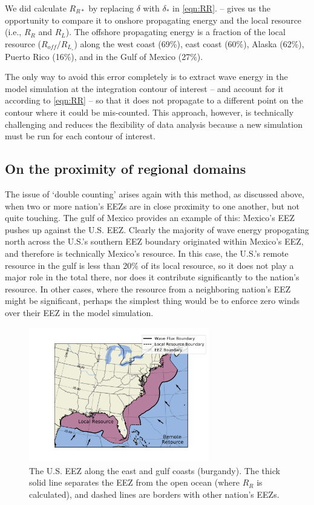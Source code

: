 We did calculate $R_{R*}$ by replacing $\delta$ with $\delta_*$ in \eqref{eqn:RR}. -- gives us the opportunity to compare it to onshore propagating energy and the local resource (i.e., $R_R$ and $R_L$). The offshore propagating energy is a fraction of the local resource ($R_{off} / R_L_\circ$) along the west coast (69\%), east coast (60\%), Alaska (62\%), Puerto Rico (16\%), and in the Gulf of Mexico (27\%). 


The only way to avoid this error completely is to extract wave energy in the model simulation at the integration contour of interest -- and account for it according to \eqref{eqn:RR} -- so that it does not propagate to a different point on the contour where it could be mis-counted. This approach, however, is technically challenging and reduces the flexibility of data analysis because a new simulation must be run for each contour of interest.

\subsection{On the proximity of regional domains}

The issue of `double counting' arises again with this method, as discussed above, when two or more nation's EEZs are in close proximity to one another, but not quite touching. The gulf of Mexico provides an example of this: Mexico's EEZ pushes up against the U.S. EEZ. Clearly the majority of wave energy propogating north across the U.S.'s southern EEZ boundary originated within Mexico's EEZ, and therefore is technically Mexico's resource. In this case, the U.S.'s remote resource in the gulf is less than 20\% of its local resource, so it does not play a major role in the total there, nor does it contribute significantly to the nation's resource. In other cases, where the resource from a neighboring nation's EEZ might be significant, perhaps the simplest thing would be to enforce zero winds over their EEZ in the model simulation.

\begin{figure}
    \centering
    \includegraphics[width=0.7\textwidth]{../fig/at_EEZ_resourcePlot}
    \caption{The U.S. EEZ along the east and gulf coasts (burgandy). The thick solid line separates the EEZ from the open ocean (where $R_R$ is calculated), and dashed lines are borders with other nation's EEZs.}
    \label{fig:at-EEZ}
\end{figure}


